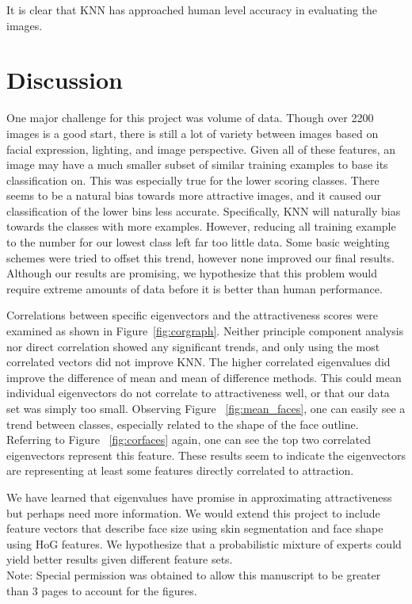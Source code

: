 \documentclass[10pt,twocolumn,letterpaper]{article}
\begin{document}
It is clear that KNN has approached human level accuracy in evaluating the images.

\section{Discussion}

One major challenge for this project was volume of data. Though over 2200 images is a good start, there is still a lot of variety between images based on facial expression, lighting, and image perspective. Given all of these features, an image may have a much smaller subset of similar training examples to base its classification on. This was especially true for the lower scoring classes. There seems to be a natural bias towards more attractive images, and it caused our classification of the lower bins less accurate. Specifically, KNN will naturally bias towards the classes with more examples. However, reducing all training example to the number for our lowest class left far too little data. Some basic weighting schemes were tried to offset this trend, however none improved our final results. Although our results are promising, we hypothesize that this problem would require extreme amounts of data before it is better than human performance. 

Correlations between specific eigenvectors and the attractiveness scores were examined as shown in Figure~\ref{fig:corgraph}. Neither principle component analysis nor direct correlation showed any significant trends, and only using the most correlated vectors did not improve KNN. The higher correlated eigenvalues did improve the difference of mean and mean of difference methods. This could mean individual eigenvectors do not correlate to attractiveness well, or that our data set was simply too small. Observing Figure ~\ref{fig:mean_faces}, one can easily see a trend between classes, especially related to the shape of the face outline. Referring to Figure ~\ref{fig:corfaces} again, one can see the top two correlated eigenvectors represent this feature. These results seem to indicate the eigenvectors are representing at least some features directly correlated to attraction.

We have learned that eigenvalues have promise in approximating attractiveness but perhaps need more information. We would extend this project to include feature vectors that describe face size using skin segmentation and face shape using HoG features. We hypothesize that a probabilistic mixture of experts could yield better results given different feature sets. \\ 


Note: Special permission was obtained to allow this manuscript to be greater than 3 pages to account for the figures.



{\small


}
\end{document}

